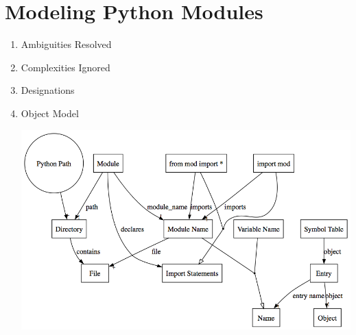 \documentclass[11pt,letterpaper]{article}
\begin{document}
\section{Modeling Python Modules}
\begin{enumerate}
\item Ambiguities Resolved\\

\item Complexities Ignored\\

\item Designations\\

\item Object Model\\
\begin{center}
\includegraphics[width=500pt]{dot/pythonmodules.png}
\label{fig:ob5}
\end{center}
\end{enumerate}
\end{document}
